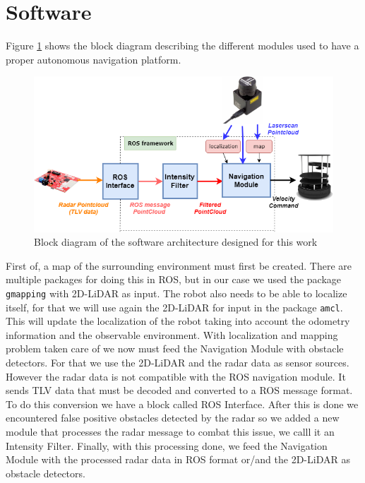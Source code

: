 \section{Software}
Figure \ref{fig::softsetup} shows the block diagram describing  the different modules used to have a proper autonomous navigation platform.
\begin{figure}[h] 
\centerline{\includegraphics [width=1.0 \textwidth]{imgs/chapter4/bd.png}}
\caption{Block diagram of the software architecture designed for this work}
\label{fig::softsetup}
\end{figure}

First of, a map of the surrounding  environment must first be created.  There are multiple packages for doing this in \ac{ROS}, but in our case we used the package \texttt{gmapping} with 2D-\ac{LiDAR} as input. The robot also needs to be able to localize itself, for that we will use again the 2D-\ac{LiDAR} for input in the package \texttt{amcl}. This will update the localization of the robot taking into account the odometry information and the observable environment. With localization and mapping problem taken care of we now must feed the Navigation Module with obstacle detectors. For that we use the 2D-LiDAR and the radar data as sensor sources.
 However the radar data is not compatible with the \ac{ROS} navigation module. It sends \ac{TLV} data that must be decoded and converted to a \ac{ROS} message format. To do this conversion we have a block called \ac{ROS} Interface. After this is done we encountered false positive obstacles detected by the radar so we added a new module that processes the radar message to combat this issue, we calll it an Intensity Filter. Finally, with this processing done, we feed the Navigation Module with the processed radar data in \ac{ROS} format or/and the 2D-\ac{LiDAR} as obstacle detectors. 

